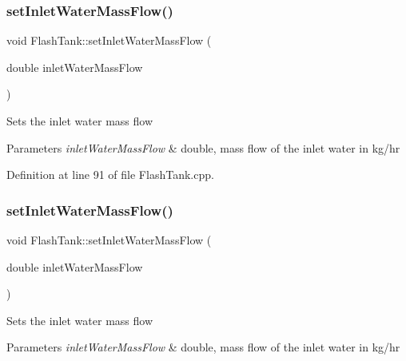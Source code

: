 \subsubsection{\texorpdfstring{set\+Inlet\+Water\+Mass\+Flow()}{setInletWaterMassFlow()}\hspace{0.1cm}{\footnotesize\ttfamily [2/3]}}
{\footnotesize\ttfamily void Flash\+Tank\+::set\+Inlet\+Water\+Mass\+Flow (\begin{DoxyParamCaption}\item[{double}]{inlet\+Water\+Mass\+Flow }\end{DoxyParamCaption})}

Sets the inlet water mass flow 
\begin{DoxyParams}{Parameters}
{\em inlet\+Water\+Mass\+Flow} & double, mass flow of the inlet water in kg/hr \\
\hline
\end{DoxyParams}


Definition at line 91 of file Flash\+Tank.\+cpp.

\mbox{\label{class_flash_tank_a2bcbd92d39ef3c760bdd65066ba3d34a}} 
\subsubsection{\texorpdfstring{set\+Inlet\+Water\+Mass\+Flow()}{setInletWaterMassFlow()}\hspace{0.1cm}{\footnotesize\ttfamily [3/3]}}
{\footnotesize\ttfamily void Flash\+Tank\+::set\+Inlet\+Water\+Mass\+Flow (\begin{DoxyParamCaption}\item[{double}]{inlet\+Water\+Mass\+Flow }\end{DoxyParamCaption})}

Sets the inlet water mass flow 
\begin{DoxyParams}{Parameters}
{\em inlet\+Water\+Mass\+Flow} & double, mass flow of the inlet water in kg/hr \\
\hline
\end{DoxyParams}
\mbox{\label{class_flash_tank_aed0991a7902401d110fb2f4b472326f5}} 
